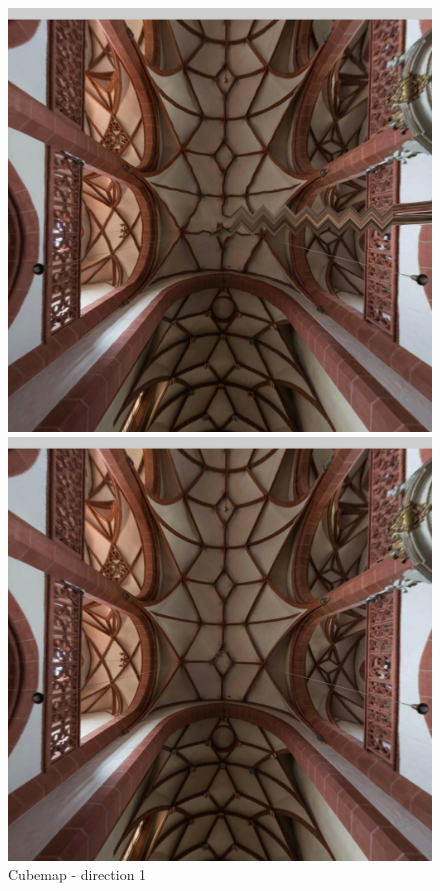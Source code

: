 \documentclass[12pt]{article}
\begin{document}
\begin{figure}[H]
\centering
  \begin{minipage}[b]{0.3\textwidth}
    \includegraphics[width=1\textwidth]{../images/screenshots/Screenshot_2_Equi2Cube.jpg}
    \caption{Cubemap - direction 1}
    \label{fig:cubemap_direction_1}
  \end{minipage}
  \hfill
  \begin{minipage}[b]{0.3\textwidth}
    \centering
    \includegraphics[width=1\textwidth]{../images/screenshots/Screenshot_2_Skybox.jpg}

\end{minipage}
\end{figure}
\end{document}
